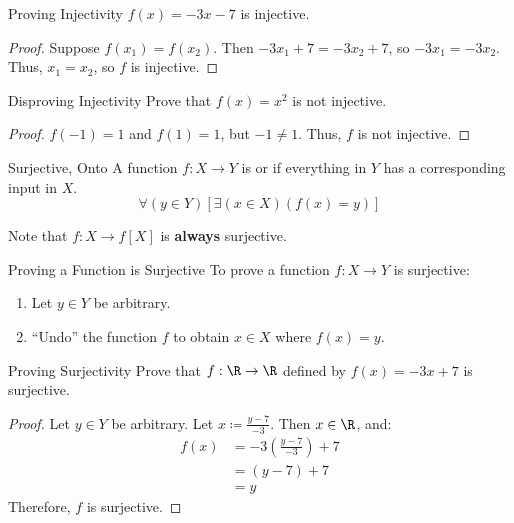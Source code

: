 \begin{exbox}{Proving Injectivity}{}
    $f(x) = -3x-7$ is injective.
    \tcblower
    \begin{proof}
        Suppose $f(x_1) = f(x_2)$. Then $-3x_1+7 = -3x_2+7$, so $-3x_1 = -3x_2$. Thus, $x_1 = x_2$, so $f$ is injective.
    \end{proof}
\end{exbox}

\begin{exbox}{Disproving Injectivity}{}
    Prove that $f(x)=x^2$ is not injective.
    \tcblower
    \begin{proof}
        $f(-1) = 1$ and $f(1) = 1$, but $-1 \neq 1$. Thus, $f$ is not injective.
    \end{proof}
\end{exbox}

\begin{dfnbox}{Surjective, Onto}{}
    A function $f : X \to Y$ is  or  if everything in $Y$ has a corresponding input in $X$.
    \tcblower
    \[ \forall (y \in Y) \left[ \exists (x \in X) (f(x) = y) \right] \]
\end{dfnbox}

Note that $f : X \to f[X]$ is \textbf{always} surjective.

\begin{tecbox}{Proving a Function is Surjective}{}
    To prove a function $f : X \to Y$ is surjective:
    \begin{enumerate}
        \item Let $y \in Y$ be arbitrary.
        \item ``Undo'' the function $f$ to obtain $x \in X$ where $f(x)=y$.
    \end{enumerate}
\end{tecbox}

\begin{exbox}{Proving Surjectivity}{}
    Prove that $f : \R \to \R$ defined by $f(x) = -3x+7$ is surjective.
    \tcblower
    \begin{proof}
        Let $y \in Y$ be arbitrary. Let $x \coloneq \frac{y-7}{-3}$. Then $x \in \R$, and:
        \begin{align*}
            f(x)
            &= -3 \left( \frac{y-7}{-3} \right) + 7 \\
            &= (y-7) + 7 \\
            &= y
        \end{align*}
        Therefore, $f$ is surjective.
    \end{proof}
\end{exbox}

